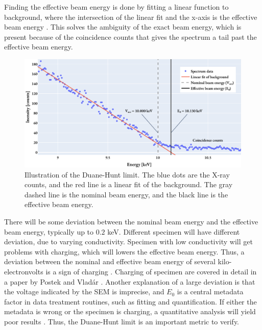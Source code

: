 Finding the effective beam energy is done by fitting a linear function to background, where the intersection of the linear fit and the x-axis is the effective beam energy \cite{software_dtsaii} \cite[Ch. 9.1.3]{goldstein_scanning_2018}.
This solves the ambiguity of the exact beam energy, which is present because of the coincidence counts that gives the spectrum a tail past the effective beam energy.

\begin{figure}[ht]
    \centering
    \includegraphics[width=0.8\linewidth]{figures/Duane-Hunt.pdf}
    \caption{
        Illustration of the Duane-Hunt limit.
        The blue dots are the X-ray counts, and the red line is a linear fit of the background.
        The gray dashed line is the nominal beam energy, and the black line is the effective beam energy.
    }
    \label{fig:duanehunt}
\end{figure}


There will be some deviation between the nominal beam energy and the effective beam energy, typically up to $0.2$ keV.
Different specimen will have different deviation, due to varying conductivity.
Specimen with low conductivity will get problems with charging, which will lowers the effective beam energy.
Thus, a deviation between the nominal and effective beam energy of several kilo-electronvolts is a sign of charging \cite{dtsaii_2_manipulating_spectra}.
Charging of specimen are covered in detail in a paper by Postek and Vladár \cite{postek_charging_2015}.
Another explanation of a large deviation is that the voltage indicated by the SEM is imprecise, and $E_0$ is a central metadata factor in data treatment routines, such as fitting and quantification.
If either the metadata is wrong or the specimen is charging, a quantitative analysis will yield poor results \cite{iso_quantification_22309}.
Thus, the Duane-Hunt limit is an important metric to verify.








